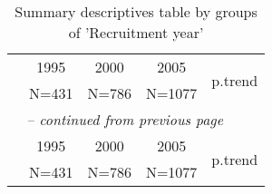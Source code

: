 
    \begin{longtable}{lcccc} 
    \caption{Summary descriptives table by groups of 'Recruitment year'}\\
    \hline  
     &         1995         &         2000         &         2005         & \multirow{2}{*}{      p.trend       }\\ 
 &        N=431         &        N=786         &        N=1077        &                      \\ 
  
    \hline
    \hline     
    \endfirsthead 
    \multicolumn{5}{l}{\tablename\ \thetable{} \textit{-- continued from previous page}}\\ 
    \hline
     &         1995         &         2000         &         2005         & \multirow{2}{*}{      p.trend       }\\ 
 &        N=431         &        N=786         &        N=1077        &                      \\ 


\end{longtable}
